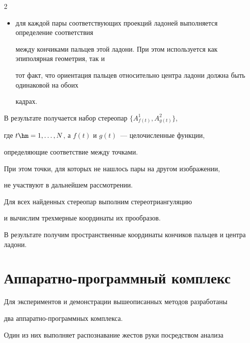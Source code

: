\begin{multicols}{2}
\begin{itemize}







\item для каждой пары соответствующих проекций ладоней выполняется определение соответствия 


между кончиками пальцев этой ладони. При этом используется как эпиполярная геометрия, так и 


тот факт, что ориентация пальцев относительно центра ладони должна быть одинаковой на обоих 


кадрах.


\end{itemize}











В результате получается набор стереопар $\{A^1_{f(t)}, A^2_{g(t)}\}$, 


где $t \hm= 1, \ldots , N$, а $f(t)$ и $g(t)$~--- целочисленные функции, 


определяющие соответствие между точками.


При этом точки, для которых не нашлось пары на другом изображении, 


не участвуют в дальнейшем рассмотрении.





Для всех найденных стереопар выполним стереотриангуляцию~\cite{MultiViewGeometry2004} 


и вычислим трехмерные координаты их прообразов.


В результате получим пространственные координаты кончиков пальцев и центра ладони.





\section{Аппаратно-программный комплекс}\label{sec:Experiments}





Для экспериментов и демонстрации вышеописанных методов разработаны 


два ап\-па\-рат\-но-про\-грам\-мных комплекса.


Один из них выполняет распознавание жестов руки посредством анализа 



\end{multicols}
